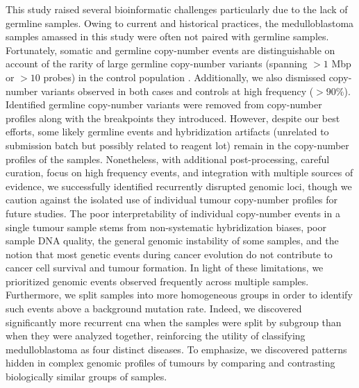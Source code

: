 This study raised several bioinformatic challenges particularly due to the lack of germline samples. Owing to current and historical practices, the medulloblastoma samples amassed in this study were often not paired with germline samples. Fortunately, somatic and germline copy-number events are distinguishable on account of the rarity of large germline copy-number variants (spanning $> 1$ Mbp or $> 10$ probes) in the control population . Additionally, we also dismissed copy-number variants observed in both cases and controls at high frequency ($> 90$\%). Identified germline copy-number variants were removed from copy-number profiles along with the breakpoints they introduced. However, despite our best efforts, some likely germline events and hybridization artifacts (unrelated to submission batch but possibly related to reagent lot) remain in the copy-number profiles of the samples. Nonetheless, with additional post-processing, careful curation, focus on high frequency events, and integration with multiple sources of evidence, we successfully identified recurrently disrupted genomic loci, though we caution against the isolated use of individual tumour copy-number profiles for future studies. The poor interpretability of individual copy-number events in a single tumour sample stems from non-systematic hybridization biases, poor sample DNA quality, the general genomic instability of some samples, and the notion that most genetic events during cancer evolution do not contribute to cancer cell survival and tumour formation. In light of these limitations, we prioritized genomic events observed frequently across multiple samples. Furthermore, we split samples into more homogeneous groups in order to identify such events above a background mutation rate. Indeed, we discovered significantly more recurrent \gls{cna} when the samples were split by subgroup than when they were analyzed together, reinforcing the utility of classifying medulloblastoma as four distinct diseases. To emphasize, we discovered patterns hidden in complex genomic profiles of tumours by comparing and contrasting biologically similar groups of samples.

